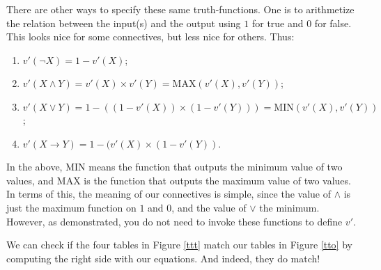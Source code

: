 There are other ways to specify these same truth-functions. One is to arithmetize the relation between the input(s) and the output using $1$ for true and $0$ for false. This looks nice for some connectives, but less nice for others. Thus: 

\begin{enumerate}
	\item $v'(\neg X)=1-v'(X)$;
	\item $v'(X \wedge Y)=v'(X)\times v'(Y)=\text{MAX}(v'(X),v'(Y))$;
	\item $v'(X \vee Y)=1-((1-v'(X)) \times (1-v'(Y)))=\text{MIN}(v'(X), v'(Y))$;
	\item $v'(X \rightarrow Y)=1 - (v'(X) \times (1-v'(Y))$. 
\end{enumerate}

\begin{remark}
In the above, $\text{MIN}$ means the function that outputs the minimum value of two values, and $\text{MAX}$ is the function that outputs the maximum value of two values. In terms of this, the meaning of our connectives is simple, since the value of $\wedge$ is just the maximum function on $1$ and $0$, and the value of $\vee$ the minimum. However, as demonstrated, you do not need to invoke these functions to define $v'$. 
\end{remark}

We can check if the four tables in Figure \ref{ttt} match our tables in Figure \ref{tto} by computing the right side with our equations. And indeed, they do match! 

